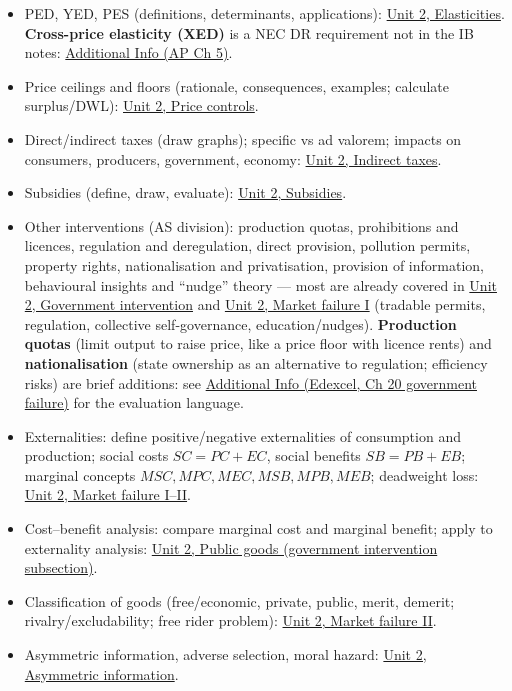 \documentclass[a4paper,12pt]{article}
\begin{document}
\begin{itemize}
  \item PED, YED, PES (definitions, determinants, applications): \hyperref[sec:elasticities]{Unit 2, Elasticities}. \textbf{Cross-price elasticity (XED)} is a NEC DR requirement not in the IB notes: \hyperref[sec:add-xed]{Additional Info (AP Ch 5)}.
  \item Price ceilings and floors (rationale, consequences, examples; calculate surplus/DWL): \hyperref[sec:gov-intervention]{Unit 2, Price controls}.
  \item Direct/indirect taxes (draw graphs); specific vs ad valorem; impacts on consumers, producers, government, economy: \hyperref[sec:gov-intervention]{Unit 2, Indirect taxes}.
  \item Subsidies (define, draw, evaluate): \hyperref[sec:gov-intervention]{Unit 2, Subsidies}.
  \item Other interventions (AS division): production quotas, prohibitions and licences, regulation and deregulation, direct provision, pollution permits, property rights, nationalisation and privatisation, provision of information, behavioural insights and ``nudge'' theory --- most are already covered in \hyperref[sec:gov-intervention]{Unit 2, Government intervention} and \hyperref[sec:market-failure-1]{Unit 2, Market failure I} (tradable permits, regulation, collective self-governance, education/nudges). \textbf{Production quotas} (limit output to raise price, like a price floor with licence rents) and \textbf{nationalisation} (state ownership as an alternative to regulation; efficiency risks) are brief additions: see \hyperref[sec:add-govfail]{Additional Info (Edexcel, Ch 20 government failure)} for the evaluation language.
  \item Externalities: define positive/negative externalities of consumption and production; social costs $SC = PC + EC$, social benefits $SB = PB + EB$; marginal concepts $MSC, MPC, MEC, MSB, MPB, MEB$; deadweight loss: \hyperref[sec:market-failure-1]{Unit 2, Market failure I--II}.
  \item Cost--benefit analysis: compare marginal cost and marginal benefit; apply to externality analysis: \hyperref[sec:market-failure-2]{Unit 2, Public goods (government intervention subsection)}.
  \item Classification of goods (free/economic, private, public, merit, demerit; rivalry/excludability; free rider problem): \hyperref[sec:market-failure-2]{Unit 2, Market failure II}.
  \item Asymmetric information, adverse selection, moral hazard: \hyperref[sec:market-failure-2]{Unit 2, Asymmetric information}.

\end{itemize}
\end{document}
